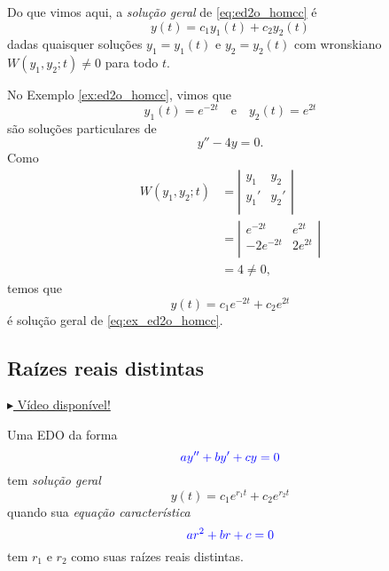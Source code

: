 Do que vimos aqui, a \emph{solução geral} de \eqref{eq:ed2o_homcc} é
\begin{equation}
  y(t) = c_1y_1(t) + c_2y_2(t)
\end{equation}
dadas quaisquer soluções  $y_1 = y_1(t)$ e $y_2 = y_2(t)$ com wronskiano $W(y_1,y_2;t)\neq 0$ para todo $t$.

\begin{ex}
  No Exemplo \ref{ex:ed2o_homcc}, vimos que
  \begin{equation}
    y_1(t) = e^{-2t}\quad\text{e}\quad y_2(t) = e^{2t}
  \end{equation}
  são soluções particulares de
  \begin{equation}\label{eq:ex_ed2o_homcc}
    y'' - 4y = 0.
  \end{equation}
  Como
  \begin{align}
    W(y_1,y_2;t) &= \left|\begin{matrix}
        y_1 & y_2 \\
        y_1' & y_2' \\
      \end{matrix}\right| \\
                 &= \left|\begin{matrix}
                     e^{-2t} & e^{2t} \\
                     -2e^{-2t} & 2e^{2t} \\
                   \end{matrix}\right| \\
                 &= 4 \neq 0,
  \end{align}
  temos que
  \begin{equation}
    y(t) = c_1e^{-2t} + c_2e^{2t}
  \end{equation}
  é solução geral de \eqref{eq:ex_ed2o_homcc}.
\end{ex}

\subsection{Raízes reais distintas}

\begin{flushright}
  \href{https://archive.org/details/edo-ordem-2-rrd}{$\blacktriangleright$ Vídeo disponível!}
\end{flushright}

Uma EDO da forma
\begin{equation}
  {\color{blue}ay'' + by' + cy = 0}
\end{equation}
tem \emph{solução geral}
\begin{equation}
  y(t) = c_1e^{r_1t} + c_2e^{r_2t}
\end{equation}
quando sua \emph{equação característica}
\begin{equation}
  {\color{blue}ar^2 + br + c = 0}
\end{equation}
tem $r_1$ e $r_2$ como suas raízes reais distintas.

